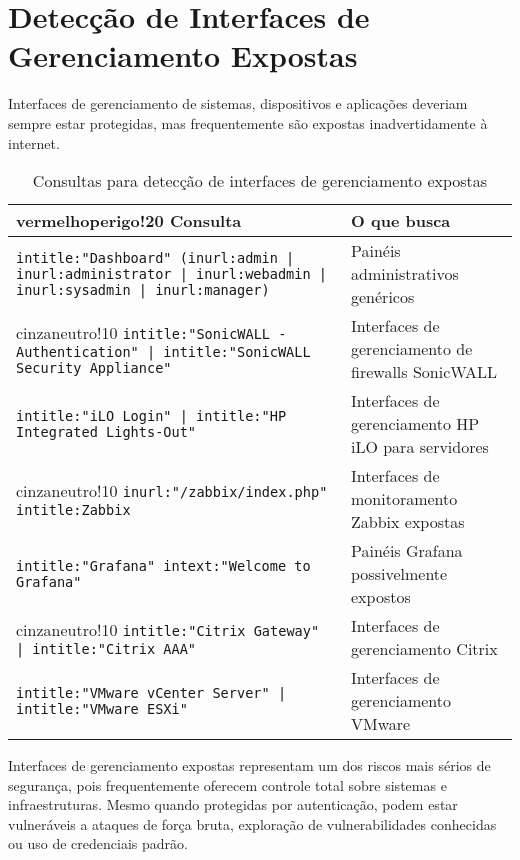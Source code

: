 \documentclass[12pt,a4paper]{book}
\begin{document}
\section{Detecção de Interfaces de Gerenciamento Expostas}

Interfaces de gerenciamento de sistemas, dispositivos e aplicações deveriam sempre estar protegidas, mas frequentemente são expostas inadvertidamente à internet.

\begin{table}[h]
\centering
\begin{tabular}{|p{8cm}|p{7cm}|}
\hline
{vermelhoperigo!20} \textbf{Consulta} & \textbf{O que busca} \\
\hline
\texttt{intitle:"Dashboard" (inurl:admin | inurl:administrator | inurl:webadmin | inurl:sysadmin | inurl:manager)} & Painéis administrativos genéricos \\
\hline
{cinzaneutro!10} \texttt{intitle:"SonicWALL - Authentication" | intitle:"SonicWALL Security Appliance"} & Interfaces de gerenciamento de firewalls SonicWALL \\
\hline
\texttt{intitle:"iLO Login" | intitle:"HP Integrated Lights-Out"} & Interfaces de gerenciamento HP iLO para servidores \\
\hline
{cinzaneutro!10} \texttt{inurl:"/zabbix/index.php" intitle:Zabbix} & Interfaces de monitoramento Zabbix expostas \\
\hline
\texttt{intitle:"Grafana" intext:"Welcome to Grafana"} & Painéis Grafana possivelmente expostos \\
\hline
{cinzaneutro!10} \texttt{intitle:"Citrix Gateway" | intitle:"Citrix AAA"} & Interfaces de gerenciamento Citrix \\
\hline
\texttt{intitle:"VMware vCenter Server" | intitle:"VMware ESXi"} & Interfaces de gerenciamento VMware \\
\hline
\end{tabular}
\caption{Consultas para detecção de interfaces de gerenciamento expostas}
\end{table}

\begin{alertbox}
Interfaces de gerenciamento expostas representam um dos riscos mais sérios de segurança, pois frequentemente oferecem controle total sobre sistemas e infraestruturas. Mesmo quando protegidas por autenticação, podem estar vulneráveis a ataques de força bruta, exploração de vulnerabilidades conhecidas ou uso de credenciais padrão.
\end{alertbox}
\end{document}
